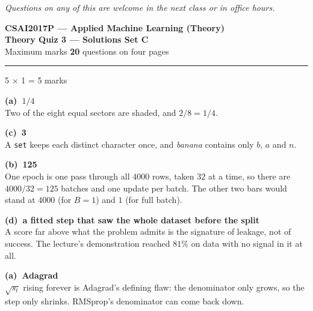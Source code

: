 \documentclass[10pt,a4paper]{article}
\newcommand{\SetLetter}{}
\newcommand{\parthead}[2]{\vspace{2pt}\noindent\rule{\linewidth}{0.4pt}\par\vspace{2pt}%
  \noindent{\bfseries Part #1}\hfill{\small #2}\par\vspace{1pt}}
\newcommand{\sol}[1]{\textbf{#1}}
\begin{document}
{\footnotesize\itshape Questions on any of this are welcome in the next class or in office hours.}

\newpage


\renewcommand{\SetLetter}{C}\setcounter{page}{1}

\begin{center}
{\large\bfseries CSAI2017P --- Applied Machine Learning (Theory)}\\[2pt]
{\large\bfseries Theory Quiz 3 --- Solutions \quad\textbullet\quad Set C}\\[3pt]
{\small Maximum marks \textbf{20} \quad\textbullet{} questions on four pages}
\end{center}
\vspace{2pt}

\noindent{}
\vspace{3pt}


\parthead{A --- Multiple choice}{5 $\times$ 1 = 5 marks}

\begin{sA}

  \item \sol{(a)\ $1/4$}\\ Two of the eight equal sectors are shaded, and $2/8 = 1/4$.

  \item \sol{(c)\ 3}\\ A \texttt{set} keeps each distinct character once, and \emph{banana} contains only $b$, $a$ and $n$.

  \item \sol{(b)\ 125}\\ One epoch is one pass through all $4000$ rows, taken $32$ at a time, so there are $4000/32 = 125$ batches and one update per batch. The other two bars would stand at $4000$ (for $B=1$) and $1$ (for full batch).

  \item \sol{(d)\ a fitted step that saw the whole dataset before the split}\\ A score far above what the problem admits is the signature of leakage, not of success. The lecture's demonstration reached $81\%$ on data with no signal in it at all.

  \item \sol{(a)\ Adagrad}\\ $\sqrt{s_t}$ rising forever is Adagrad's defining flaw: the denominator only grows, so the step only shrinks. RMSprop's denominator can come back down.

\end{sA}
\end{document}
